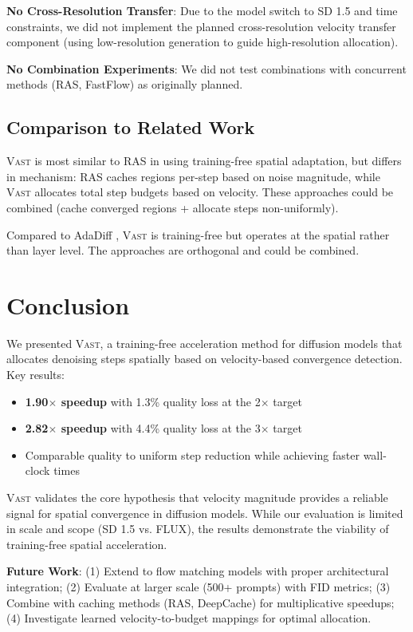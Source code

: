 \documentclass{article}
\newcommand{\vast}{\textsc{Vast}}
\newcommand{\flux}{\textsc{FLUX}}
\begin{document}
\textbf{No Cross-Resolution Transfer}: Due to the model switch to SD 1.5 and time constraints, we did not implement the planned cross-resolution velocity transfer component (using low-resolution generation to guide high-resolution allocation).

\textbf{No Combination Experiments}: We did not test combinations with concurrent methods (RAS, FastFlow) as originally planned.

\subsection{Comparison to Related Work}

\vast{} is most similar to RAS \citep{liu2025ras} in using training-free spatial adaptation, but differs in mechanism: RAS caches regions per-step based on noise magnitude, while \vast{} allocates total step budgets based on velocity. These approaches could be combined (cache converged regions + allocate steps non-uniformly).

Compared to AdaDiff \citep{tang2024adadiff}, \vast{} is training-free but operates at the spatial rather than layer level. The approaches are orthogonal and could be combined.

\section{Conclusion}
\label{sec:conclusion}

We presented \vast{}, a training-free acceleration method for diffusion models that allocates denoising steps spatially based on velocity-based convergence detection. Key results:

\begin{itemize}
    \item \textbf{1.90$\times$ speedup} with 1.3\% quality loss at the 2$\times$ target
    \item \textbf{2.82$\times$ speedup} with 4.4\% quality loss at the 3$\times$ target
    \item Comparable quality to uniform step reduction while achieving faster wall-clock times
\end{itemize}

\vast{} validates the core hypothesis that velocity magnitude provides a reliable signal for spatial convergence in diffusion models. While our evaluation is limited in scale and scope (SD 1.5 vs. \flux{}), the results demonstrate the viability of training-free spatial acceleration.

\textbf{Future Work}: (1) Extend to flow matching models with proper architectural integration; (2) Evaluate at larger scale (500+ prompts) with FID metrics; (3) Combine with caching methods (RAS, DeepCache) for multiplicative speedups; (4) Investigate learned velocity-to-budget mappings for optimal allocation.



\end{document}
